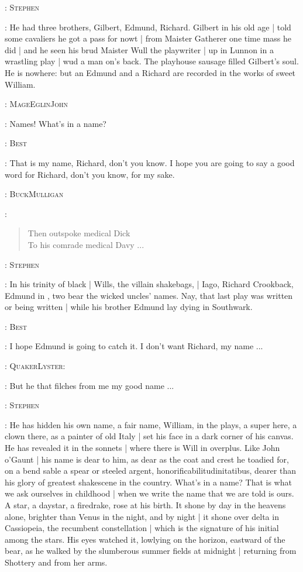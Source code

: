 :
{\textsc{Stephen}}

\Stephen:
He had three brothers,
Gilbert,
Edmund,
Richard.
Gilbert in his old age |
told some cavaliers he got a pass for nowt |
from Maister Gatherer one time mass he did |
and he seen his brud Maister Wull the playwriter |
up in Lunnon in a wrastling play |
wud a man on's back.
The playhouse sausage filled Gilbert's soul.
He is nowhere:
but an Edmund and a Richard are recorded in the works of sweet William.

:
{\textsc{MageEglinJohn}}

\eglinton:
Names!
What's in a name?

:
{\textsc{Best}}

\best:
That is my name,
Richard,
don't you know.
I hope you are going to say a good word for Richard,
don't you know,
for my sake.


:
{\textsc{BuckMulligan}}

\mulligan:
\begin{verse}
         Then outspoke medical Dick \\
         To his comrade medical Davy ...
\end{verse}

:
{\textsc{Stephen}}

\Stephen:
In his trinity of black |
Wills,
the villain shakebags, |
Iago,
Richard Crookback,
Edmund in ,
two bear the wicked uncles' names.
Nay,
that last play was written or being written |
while his brother Edmund lay dying in Southwark.

:
{\textsc{Best}}

\best:
I hope Edmund is going to catch it.
I don't want Richard, my name ...


:
{\textsc{QuakerLyster:}}

\librarian:
But he that filches from me my good name ...

:
{\textsc{Stephen}}

\Stephen:
He has hidden his own name,
a fair name,
William,
in the plays,
a super here,
a clown there,
as a painter of old Italy |
set his face in a dark corner of his canvas.
He has revealed it in the sonnets |
where there is Will in overplus.
Like John o'Gaunt |
his name is dear to him,
as dear as the coat and crest he toadied for,
on a bend sable a spear or steeled argent,
honorificabilitudinitatibus,
dearer than his glory of greatest shakescene in the country.
What's in a name?
That is what we ask ourselves in childhood |
when we write the name that we are told is ours.
A star,
a daystar,
a firedrake,
rose at his birth.
It shone by day in the heavens alone,
brighter than Venus in the night,
and by night |
it shone over delta in Cassiopeia,
the recumbent constellation |
which is the signature of his initial among the stars.
His eyes watched it,
lowlying on the horizon,
eastward of the bear,
as he walked by the slumberous summer fields at midnight |
returning from Shottery and from her arms.

